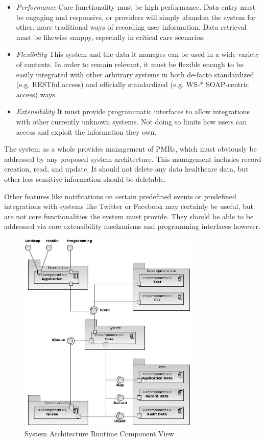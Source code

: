 \documentclass[10pt, conference, compsocconf]{IEEEtran}
\begin{document}
\begin{itemize}
\item \textit{Performance} Core functionality must be high performance.  Data entry must be engaging and responsive, or providers will simply abandon the system for other, more traditional ways of recording user information.  Data retrieval must be likewise snappy, especially in critical care scenarios.

\item \textit{Flexibility} This system and the data it manages can be used in a wide variety of contexts.  In order to remain relevant, it must be flexible enough to be easily integrated with other arbitrary systems in both de-facto standardized (e.g. RESTful access) and officially standardized (e.g. WS-* SOAP-centric access) ways.

\item \textit{Extensibility} It must provide programmatic interfaces to allow integrations with other currently unknown systems.  Not doing so limits how users can access and exploit the information they own.

\end{itemize}

The system as a whole provides management of PMRs, which must obviously be addressed by any proposed system architecture.  This management includes record creation, read, and update. It should not delete any data healthcare data, but other less sensitive information should be deletable.

Other features like notifications on certain predefined events or predefined integrations with systems like Twitter or Facebook may certainly be useful, but are not core functionalities the system must provide.  They should be able to be addressed via core extensibility mechanisms and programming interfaces however.  

\begin{figure}[!t]
\centering
\includegraphics[width=3.4in]{HisbSystemArch}
\caption{System Architecture Runtime Component View}
\label{fig:RuntimeView}
\end{figure}
\end{document}
